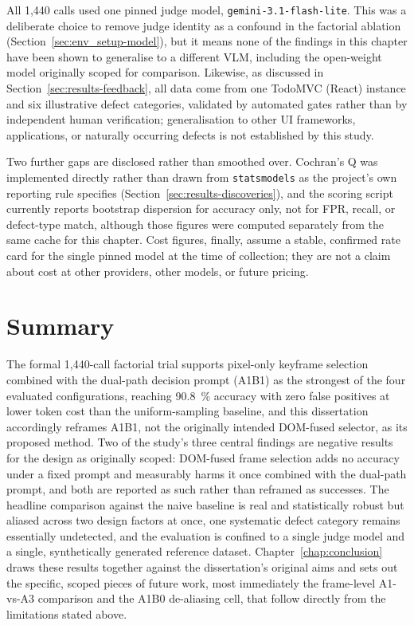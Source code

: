 All 1{,}440 calls used one pinned judge model, \texttt{gemini-3.1-flash-lite}. This was a deliberate choice to remove judge identity as a confound in the factorial ablation (Section~\ref{sec:env_setup-model}), but it means none of the findings in this chapter have been shown to generalise to a different VLM, including the open-weight model originally scoped for comparison. Likewise, as discussed in Section~\ref{sec:results-feedback}, all data come from one TodoMVC (React) instance and six illustrative defect categories, validated by automated gates rather than by independent human verification; generalisation to other UI frameworks, applications, or naturally occurring defects is not established by this study.

Two further gaps are disclosed rather than smoothed over. Cochran's Q was implemented directly rather than drawn from \texttt{statsmodels} as the project's own reporting rule specifies (Section~\ref{sec:results-discoveries}), and the scoring script currently reports bootstrap dispersion for accuracy only, not for FPR, recall, or defect-type match, although those figures were computed separately from the same cache for this chapter. Cost figures, finally, assume a stable, confirmed rate card for the single pinned model at the time of collection; they are not a claim about cost at other providers, other models, or future pricing.

\section{Summary}
\label{sec:results-summary}
The formal 1{,}440-call factorial trial supports pixel-only keyframe selection combined with the dual-path decision prompt (A1B1) as the strongest of the four evaluated configurations, reaching \SI{90.8}{\percent} accuracy with zero false positives at lower token cost than the uniform-sampling baseline, and this dissertation accordingly reframes A1B1, not the originally intended DOM-fused selector, as its proposed method. Two of the study's three central findings are negative results for the design as originally scoped: DOM-fused frame selection adds no accuracy under a fixed prompt and measurably harms it once combined with the dual-path prompt, and both are reported as such rather than reframed as successes. The headline comparison against the naive baseline is real and statistically robust but aliased across two design factors at once, one systematic defect category remains essentially undetected, and the evaluation is confined to a single judge model and a single, synthetically generated reference dataset. Chapter~\ref{chap:conclusion} draws these results together against the dissertation's original aims and sets out the specific, scoped pieces of future work, most immediately the frame-level A1-vs-A3 comparison and the A1B0 de-aliasing cell, that follow directly from the limitations stated above.

